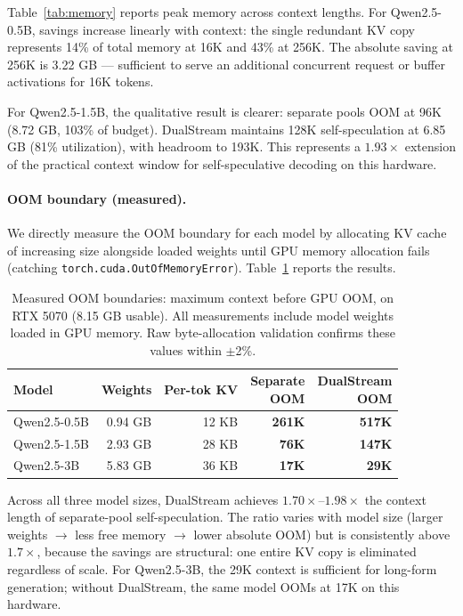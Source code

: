\documentclass[review]{elsarticle}
\theoremstyle{definition}
\theoremstyle{remark}
\begin{document}
Table~\ref{tab:memory} reports peak memory across context lengths.
For Qwen2.5-0.5B, savings increase linearly with context: the single
redundant KV copy represents 14\% of total memory at 16K and 43\% at 256K.
The absolute saving at 256K is 3.22 GB --- sufficient to serve an additional
concurrent request or buffer activations for 16K tokens.

For Qwen2.5-1.5B, the qualitative result is clearer: separate pools OOM
at 96K (8.72 GB, 103\% of budget). DualStream maintains 128K
self-speculation at 6.85 GB (81\% utilization), with headroom to 193K.
This represents a $1.93\times$ extension of the practical context window
for self-speculative decoding on this hardware.

\paragraph{OOM boundary (measured).}
We directly measure the OOM boundary for each model by allocating KV
cache of increasing size alongside loaded weights until GPU memory
allocation fails (catching \texttt{torch.cuda.OutOfMemoryError}).
Table~\ref{tab:oom} reports the results.

\begin{table}[t]
\centering
\caption{Measured OOM boundaries: maximum context before GPU OOM,
on RTX 5070 (8.15 GB usable). All measurements include model weights
loaded in GPU memory. Raw byte-allocation validation confirms these
values within $\pm$2\%.}
\label{tab:oom}
\begin{tabular}{lrrrr}
\toprule
Model & Weights & Per-tok KV & \makecell{Separate\\OOM} & \makecell{DualStream\\OOM} \\
\midrule
Qwen2.5-0.5B & 0.94 GB & 12 KB & \textbf{261K} & \textbf{517K} \\
Qwen2.5-1.5B & 2.93 GB & 28 KB & \textbf{76K}  & \textbf{147K} \\
Qwen2.5-3B   & 5.83 GB & 36 KB & \textbf{17K}  & \textbf{29K} \\
\bottomrule
\end{tabular}
\end{table}

Across all three model sizes, DualStream achieves $1.70\times$--$1.98\times$
the context length of separate-pool self-speculation. The ratio
varies with model size (larger weights $\to$ less free memory $\to$ lower
absolute OOM) but is consistently above $1.7\times$, because the savings
are structural: one entire KV copy is eliminated regardless of scale. For
Qwen2.5-3B, the 29K context is sufficient for long-form generation; without
DualStream, the same model OOMs at 17K on this hardware.
\end{document}

